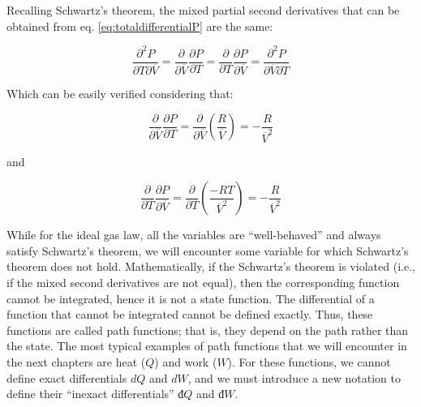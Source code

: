 \documentclass[
  9pt,
]{extbook}
\theoremstyle{definition}
\theoremstyle{definition}
\theoremstyle{definition}
\theoremstyle{remark}
\begin{document}
Recalling Schwartz's theorem, the mixed partial second derivatives that can be obtained from eq. \eqref{eq:totaldifferentialP} are the same:

\begin{equation}
  \frac{\partial^2 P}{\partial T \partial \overline{V}}=\frac{\partial}{\partial \overline{V}}\frac{\partial P}{\partial T}=\frac{\partial}{\partial T}\frac{\partial P}{\partial \overline{V}}=\frac{\partial^2 P}{\partial \overline{V} \partial T}
  \label{eq:schwartzP}
\end{equation}

Which can be easily verified considering that:

\begin{equation}
  \frac{\partial}{\partial \overline{V}} \frac{\partial P}{\partial T}  = \frac{\partial}{\partial \overline{V}} \left(\frac{R}{\overline{V}}\right) = -\frac{R}{\overline{V}^2} 
  \label{eq:secondderPA}
\end{equation}

and

\begin{equation}
  \frac{\partial}{\partial T} \frac{\partial P}{\partial \overline{V}}  = \frac{\partial}{\partial T} \left(\frac{-RT}{\overline{V}^2}\right) = -\frac{R}{\overline{V}^2} 
  \label{eq:secondderPB}
\end{equation}

While for the ideal gas law, all the variables are ``well-behaved'' and always satisfy Schwartz's theorem, we will encounter some variable for which Schwartz's theorem does not hold. Mathematically, if the Schwartz's theorem is violated (i.e., if the mixed second derivatives are not equal), then the corresponding function cannot be integrated, hence it is not a state function. The differential of a function that cannot be integrated cannot be defined exactly. Thus, these functions are called path functions; that is, they depend on the path rather than the state. The most typical examples of path functions that we will encounter in the next chapters are heat (\(Q\)) and work (\(W\)). For these functions, we cannot define exact differentials \(dQ\) and \(dW\), and we must introduce a new notation to define their ``inexact differentials'' \(đ Q\) and \(đ W\).
\end{document}

